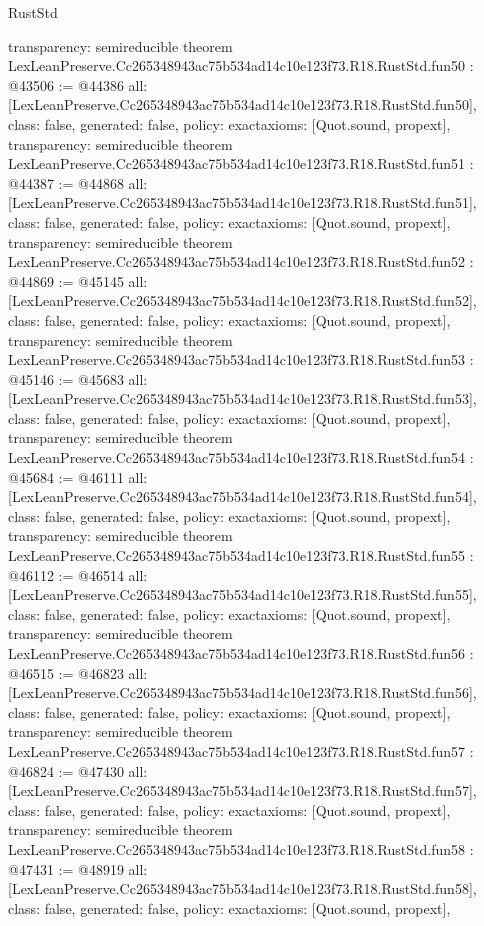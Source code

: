 \begin{lexlean}{RustStd}
\begin{coremodule}
{  transparency: semireducible
}
theorem LexLeanPreserve.Cc265348943ac75b534ad14c10e123f73.R18.RustStd.fun50 : @43506 := @44386 {
  all: [LexLeanPreserve.Cc265348943ac75b534ad14c10e123f73.R18.RustStd.fun50],
  class: false,
  generated: false,
  policy: exact{axioms: [Quot.sound, propext]},
  transparency: semireducible
}
theorem LexLeanPreserve.Cc265348943ac75b534ad14c10e123f73.R18.RustStd.fun51 : @44387 := @44868 {
  all: [LexLeanPreserve.Cc265348943ac75b534ad14c10e123f73.R18.RustStd.fun51],
  class: false,
  generated: false,
  policy: exact{axioms: [Quot.sound, propext]},
  transparency: semireducible
}
theorem LexLeanPreserve.Cc265348943ac75b534ad14c10e123f73.R18.RustStd.fun52 : @44869 := @45145 {
  all: [LexLeanPreserve.Cc265348943ac75b534ad14c10e123f73.R18.RustStd.fun52],
  class: false,
  generated: false,
  policy: exact{axioms: [Quot.sound, propext]},
  transparency: semireducible
}
theorem LexLeanPreserve.Cc265348943ac75b534ad14c10e123f73.R18.RustStd.fun53 : @45146 := @45683 {
  all: [LexLeanPreserve.Cc265348943ac75b534ad14c10e123f73.R18.RustStd.fun53],
  class: false,
  generated: false,
  policy: exact{axioms: [Quot.sound, propext]},
  transparency: semireducible
}
theorem LexLeanPreserve.Cc265348943ac75b534ad14c10e123f73.R18.RustStd.fun54 : @45684 := @46111 {
  all: [LexLeanPreserve.Cc265348943ac75b534ad14c10e123f73.R18.RustStd.fun54],
  class: false,
  generated: false,
  policy: exact{axioms: [Quot.sound, propext]},
  transparency: semireducible
}
theorem LexLeanPreserve.Cc265348943ac75b534ad14c10e123f73.R18.RustStd.fun55 : @46112 := @46514 {
  all: [LexLeanPreserve.Cc265348943ac75b534ad14c10e123f73.R18.RustStd.fun55],
  class: false,
  generated: false,
  policy: exact{axioms: [Quot.sound, propext]},
  transparency: semireducible
}
theorem LexLeanPreserve.Cc265348943ac75b534ad14c10e123f73.R18.RustStd.fun56 : @46515 := @46823 {
  all: [LexLeanPreserve.Cc265348943ac75b534ad14c10e123f73.R18.RustStd.fun56],
  class: false,
  generated: false,
  policy: exact{axioms: [Quot.sound, propext]},
  transparency: semireducible
}
theorem LexLeanPreserve.Cc265348943ac75b534ad14c10e123f73.R18.RustStd.fun57 : @46824 := @47430 {
  all: [LexLeanPreserve.Cc265348943ac75b534ad14c10e123f73.R18.RustStd.fun57],
  class: false,
  generated: false,
  policy: exact{axioms: [Quot.sound, propext]},
  transparency: semireducible
}
theorem LexLeanPreserve.Cc265348943ac75b534ad14c10e123f73.R18.RustStd.fun58 : @47431 := @48919 {
  all: [LexLeanPreserve.Cc265348943ac75b534ad14c10e123f73.R18.RustStd.fun58],
  class: false,
  generated: false,
  policy: exact{axioms: [Quot.sound, propext]},
}
\end{coremodule}
\end{lexlean}
